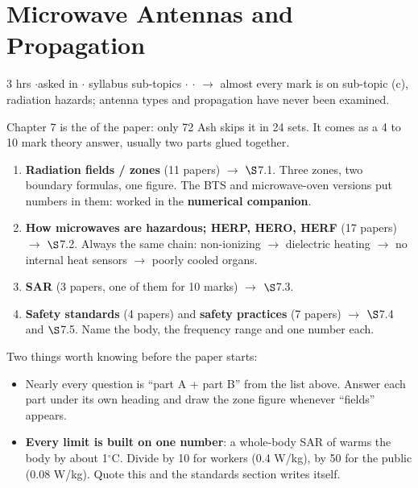 \section{Microwave Antennas and Propagation}
{\color{sub}\footnotesize 3 hrs \gap$\cdot$\gap asked in 
\gap$\cdot$ syllabus sub-topics \gap$\cdot$\gap {} \gap$\cdot$\gap {}
$\rightarrow$ almost every mark is on sub-topic (c), radiation hazards; antenna types and
propagation have never been examined.}

\vspace{3pt}\noindent
\colorbox{gdL}{\makebox[\dimexpr\textwidth-2\fboxsep][l]{%
  \textcolor{gd}{\bfseries\footnotesize READ THIS FIRST}}}
\par\nobreak\vspace{3pt}

Chapter 7 is the  of the paper: only 72 Ash skips it in 24 sets.
It comes as a 4 to 10 mark theory answer, usually two parts glued together.
\begin{enumerate}[label=\arabic*., leftmargin=1.4em, itemsep=1pt]
  \item \textbf{Radiation fields / zones} (11 papers) $\rightarrow$ $\S$7.1. Three zones, two
    boundary formulas, one figure. The BTS and microwave-oven versions put numbers in them:
    worked in the \textbf{numerical companion}.
  \item \textbf{How microwaves are hazardous; HERP, HERO, HERF} (17 papers) $\rightarrow$
    $\S$7.2. Always the same chain: non-ionizing $\rightarrow$ dielectric heating
    $\rightarrow$ no internal heat sensors $\rightarrow$ poorly cooled organs.
  \item \textbf{SAR} (3 papers, one of them for 10 marks) $\rightarrow$ $\S$7.3.
  \item \textbf{Safety standards} (4 papers) and \textbf{safety practices} (7 papers)
    $\rightarrow$ $\S$7.4 and $\S$7.5. Name the body, the frequency range and one number each.
\end{enumerate}
Two things worth knowing before the paper starts:
\begin{itemize}
  \item Nearly every question is ``part A + part B'' from the list above. Answer each part
    under its own heading and draw the zone figure whenever ``fields'' appears.
  \item \textbf{Every limit is built on one number}: a whole-body SAR of  warms
    the body by about 1$^\circ$C. Divide by 10 for workers (0.4 W/kg), by 50 for the public
    (0.08 W/kg). Quote this and the standards section writes itself.
\end{itemize}

